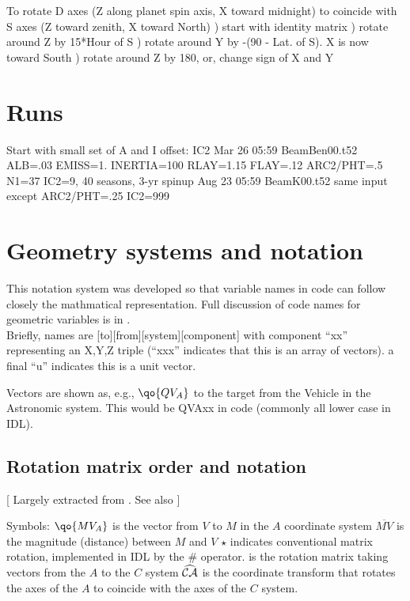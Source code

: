 \documentclass{article}
\begin{document}
To rotate D axes (Z along planet spin axis, X toward midnight) to coincide with S axes (Z toward zenith, X toward North)
) start with identity matrix
) rotate around Z by 15*Hour of S
) rotate around Y by -(90 - Lat. of S). X is now toward South
) rotate around Z by 180\qd, or, change sign of X and Y
 \section{Runs}
 Start with small set of A and I
 \qi offset: IC2
\qii 
Mar 26 05:59 BeamBen00.t52 ALB=.03 EMISS=1. INERTIA=100  RLAY=1.15 FLAY=.12
  ARC2/PHT=.5  N1=37 IC2=9, 40 seasons, 3-yr spinup
Aug 23 05:59 BeamK00.t52  same input except ARC2/PHT=.25  IC2=999




\appendix %

\section{Geometry systems and notation \label{geomn}}
 This notation system was developed so that variable names in code can follow closely the mathmatical representation.  
Full discussion of code names for geometric variables is in .  
\\ Briefly, names are [to][from][system][component] with component ``xx'' representing an X,Y,Z triple (``xxx'' indicates that this is an array of vectors).
\qi a final ``u'' indicates this is a unit vector. 

Vectors are shown as, e.g., $\qo{QV_A}$ to the target from the Vehicle in the Astronomic system. This would be QVAxx in code (commonly all lower case in IDL).
  

\subsection{Rotation matrix order and notation \label{rotnot}} %
[ Largely extracted from . See also  ]

Symbols: 
\qi  $\qo{MV_A}$ is the vector from $V$ to $M$ in the $A$ coordinate system 
\qi $\overline{MV}$ is the magnitude (distance) between $M$ and $V$
\qi $\star$ indicates conventional matrix rotation, implemented in IDL by the \#
 operator.
\qi {} is the rotation matrix taking vectors from the $A$ to the $C$ system
\qi  $\widehat {\mathcal{CA}}$ is the coordinate transform that rotates the axes of the $A$ to 
coincide with the axes of the $C$ system. 
\end{document}
